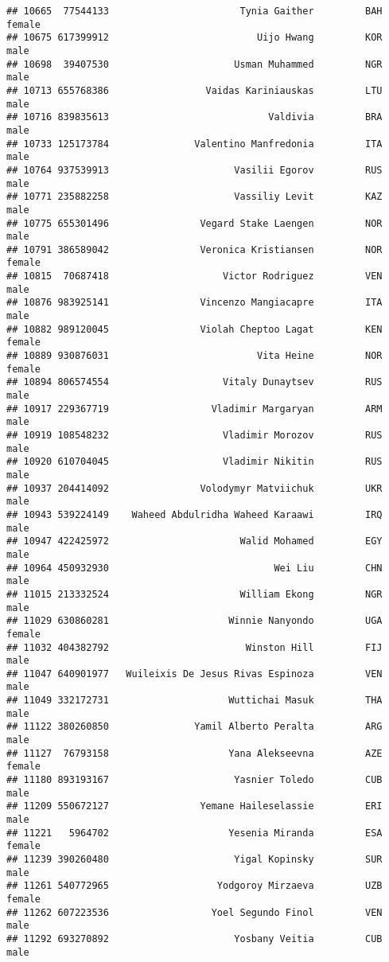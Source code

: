 \documentclass[]{article}
\begin{document}
\begin{verbatim}
## 10665  77544133                       Tynia Gaither         BAH female
## 10675 617399912                          Uijo Hwang         KOR   male
## 10698  39407530                      Usman Muhammed         NGR   male
## 10713 655768386                 Vaidas Kariniauskas         LTU   male
## 10716 839835613                            Valdivia         BRA   male
## 10733 125173784               Valentino Manfredonia         ITA   male
## 10764 937539913                      Vasilii Egorov         RUS   male
## 10771 235882258                      Vassiliy Levit         KAZ   male
## 10775 655301496                Vegard Stake Laengen         NOR   male
## 10791 386589042                Veronica Kristiansen         NOR female
## 10815  70687418                    Victor Rodriguez         VEN   male
## 10876 983925141                Vincenzo Mangiacapre         ITA   male
## 10882 989120045                Violah Cheptoo Lagat         KEN female
## 10889 930876031                          Vita Heine         NOR female
## 10894 806574554                    Vitaly Dunaytsev         RUS   male
## 10917 229367719                  Vladimir Margaryan         ARM   male
## 10919 108548232                    Vladimir Morozov         RUS   male
## 10920 610704045                    Vladimir Nikitin         RUS   male
## 10937 204414092                Volodymyr Matviichuk         UKR   male
## 10943 539224149    Waheed Abdulridha Waheed Karaawi         IRQ   male
## 10947 422425972                       Walid Mohamed         EGY   male
## 10964 450932930                             Wei Liu         CHN   male
## 11015 213332524                       William Ekong         NGR   male
## 11029 630860281                     Winnie Nanyondo         UGA female
## 11032 404382792                        Winston Hill         FIJ   male
## 11047 640901977   Wuileixis De Jesus Rivas Espinoza         VEN   male
## 11049 332172731                     Wuttichai Masuk         THA   male
## 11122 380260850               Yamil Alberto Peralta         ARG   male
## 11127  76793158                     Yana Alekseevna         AZE female
## 11180 893193167                      Yasnier Toledo         CUB   male
## 11209 550672127                Yemane Haileselassie         ERI   male
## 11221   5964702                     Yesenia Miranda         ESA female
## 11239 390260480                      Yigal Kopinsky         SUR   male
## 11261 540772965                   Yodgoroy Mirzaeva         UZB female
## 11262 607223536                  Yoel Segundo Finol         VEN   male
## 11292 693270892                      Yosbany Veitia         CUB   male

\end{verbatim}
\end{document}
